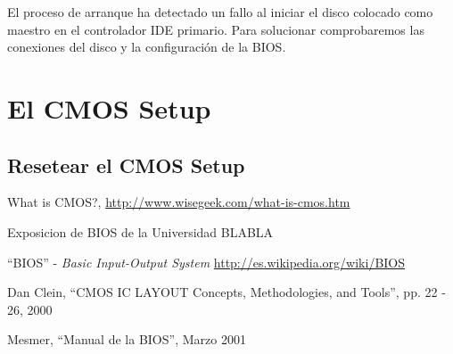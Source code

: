 \documentclass[12pt,oneside,a4paper]{article}
\begin{document}
			El proceso de arranque ha detectado un fallo al iniciar el disco
			colocado como maestro en el controlador IDE primario. Para
			solucionar comprobaremos las conexiones del disco y la
			configuración de la BIOS. 

	\newpage

\section{El CMOS Setup}{\label{sec:cmossetup}}
	\subsection{Resetear el CMOS Setup}{\label{sec:cmossetup/resetear-el-cmos-setup}}

	\newpage

\begin{thebibliography}{9}{\label{sec:bibliografia}}

		What is CMOS?,
		\url{http://www.wisegeek.com/what-is-cmos.htm}

		Exposicion de BIOS de la Universidad BLABLA

		``BIOS'' - {\em Basic Input-Output System}
		\url{http://es.wikipedia.org/wiki/BIOS}

		Dan Clein, ``CMOS IC LAYOUT Concepts, Methodologies, and Tools'', pp. 22 - 26, 2000

		Mesmer, ``Manual de la BIOS'', Marzo 2001

\end{thebibliography}
\end{document}
